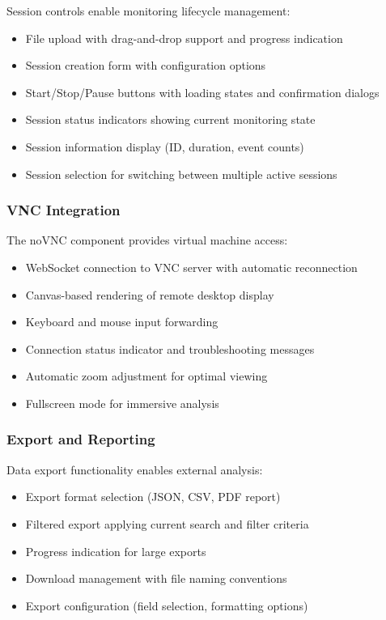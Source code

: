 Session controls enable monitoring lifecycle management:

\begin{itemize}
    \item File upload with drag-and-drop support and progress indication
    \item Session creation form with configuration options
    \item Start/Stop/Pause buttons with loading states and confirmation dialogs
    \item Session status indicators showing current monitoring state
    \item Session information display (ID, duration, event counts)
    \item Session selection for switching between multiple active sessions
\end{itemize}

\subsubsection{VNC Integration}

The noVNC component provides virtual machine access:

\begin{itemize}
    \item WebSocket connection to VNC server with automatic reconnection
    \item Canvas-based rendering of remote desktop display
    \item Keyboard and mouse input forwarding
    \item Connection status indicator and troubleshooting messages
    \item Automatic zoom adjustment for optimal viewing
    \item Fullscreen mode for immersive analysis
\end{itemize}

\subsubsection{Export and Reporting}

Data export functionality enables external analysis:

\begin{itemize}
    \item Export format selection (JSON, CSV, PDF report)
    \item Filtered export applying current search and filter criteria
    \item Progress indication for large exports
    \item Download management with file naming conventions
    \item Export configuration (field selection, formatting options)
\end{itemize}

